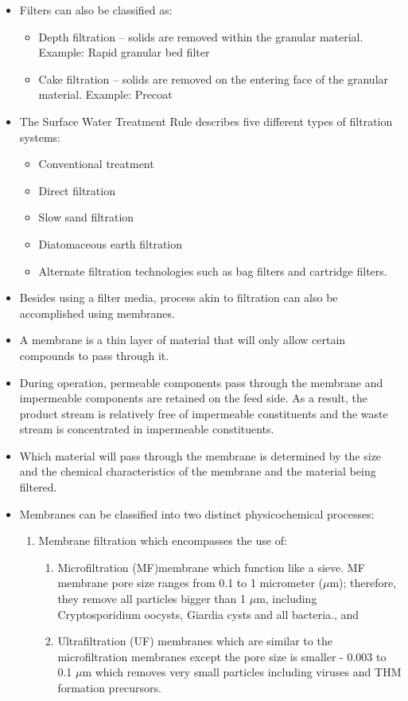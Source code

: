 \begin{itemize}
\item Filters can also be classified as:
\begin{itemize}
\item Depth filtration – solids are removed within the granular material.  Example: Rapid granular bed filter
\item Cake filtration – solids are removed on the entering face of the granular material.  Example: Precoat
\end{itemize}
\item The Surface Water Treatment Rule describes five different types of filtration systems: 
\begin{itemize}
\item Conventional treatment
\item Direct filtration
\item Slow sand filtration
\item Diatomaceous earth filtration
\item Alternate filtration technologies such as bag filters and cartridge filters.
\end{itemize}
\item Besides using a filter media, process akin to filtration can also be accomplished using membranes. 
\item A membrane is a thin layer of material that will only allow certain compounds to pass through it. 
\item During operation, permeable components pass through the membrane and impermeable components are retained on the feed side. As a result, the product stream is relatively free of impermeable constituents and the waste stream is concentrated in impermeable constituents.
\item Which material will pass through the membrane is determined by the size and the chemical characteristics of the membrane and the material being filtered.
\item Membranes can be classified into two distinct physicochemical
processes: 
\begin{enumerate}
\item Membrane filtration which encompasses the use of:
\begin{enumerate}
\item Microfiltration (MF)membrane which function like a sieve. MF membrane pore size ranges from 0.1 to 1 micrometer ($\mu$m); therefore, they remove all particles bigger than 1 $\mu$m, including Cryptosporidium oocysts, Giardia cysts and all bacteria., and 
\item Ultrafiltration (UF) membranes which are similar to the microfiltration membranes except the pore size is smaller - 0.003 to 0.1 $\mu$m which removes very small particles including viruses and THM formation precursors.

\end{enumerate}
\end{enumerate}
\end{itemize}
